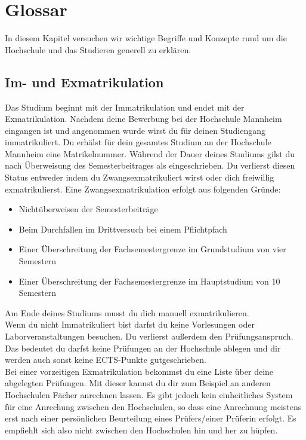 \section*{Glossar}
In diesem Kapitel versuchen wir wichtige Begriffe und Konzepte rund um die Hochschule und das Studieren generell zu erklären.

\subsection*{Im- und Exmatrikulation}\label{glos:exma}
Das Studium beginnt mit der Immatrikulation und endet mit der Exmatrikulation.
Nachdem deine Bewerbung bei der Hochschule Mannheim eingangen ist und angenommen wurde wirst du für deinen Studiengang immatrikuliert.
Du erhälst für dein gesamtes Studium an der Hochschule Mannheim eine Matrikelnummer.
Während der Dauer deines Studiums gilst du nach Überweisung des Semesterbeitrages als eingeschrieben.
Du verlierst diesen Status entweder indem du Zwangsexmatrikuliert wirst oder dich freiwillig exmatrikulierst.
Eine Zwangsexmatrikulation erfolgt aus folgenden Gründe:
\begin{itemize}
    \item Nichtüberweisen der Semesterbeiträge
    \item Beim Durchfallen im Drittversuch bei einem Pflichtpfach
    \item Einer Überschreitung der Fachsemestergrenze im Grundstudium von vier Semestern
    \item Einer Überschreitung der Fachsemestergrenze im Hauptstudium von 10 Semestern
\end{itemize}
Am Ende deines Studiums musst du dich manuell exmatrikulieren.
\\
Wenn du nicht Immatrikuliert bist darfst du keine Vorlesungen oder Laborveranstaltungen besuchen.
Du verlierst außerdem den Prüfungsanspruch.
Das bedeutet du darfst keine Prüfungen an der Hochschule ablegen und dir werden auch sonst keine ECTS-Punkte gutgeschrieben.
\\

Bei einer vorzeitigen Exmatrikulation bekommst du eine Liste über deine abgelegten Prüfungen.
Mit dieser kannst du dir zum Beispiel an anderen Hochschulen Fächer anrechnen lassen.
Es gibt jedoch kein einheitliches System für eine Anrechung zwischen den Hochschulen, so dass eine Anrechnung meistens erst nach einer persönlichen Beurteilung eines Prüfers/einer Prüferin erfolgt.
Es empfiehlt sich also nicht zwischen den Hochschulen hin und her zu hüpfen.

